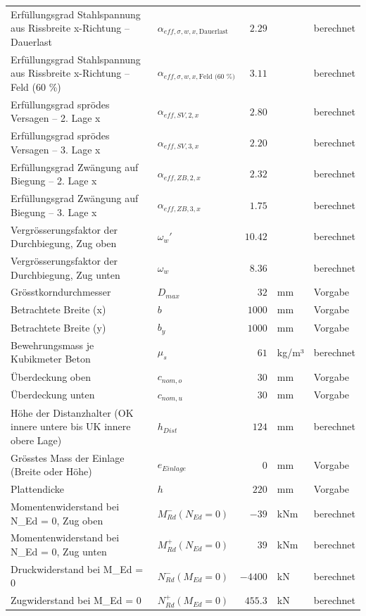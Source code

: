 \documentclass[11pt,a4paper]{article}
\begin{document}
\begin{xltabular}{\linewidth}{>{\raggedright\arraybackslash}Xlrll}
Erfüllungsgrad Stahlspannung aus Rissbreite x-Richtung – Dauerlast & $\alpha_{eff,\sigma,w,x,\text{Dauerlast}}$ & $2.29$ &  & berechnet \\
Erfüllungsgrad Stahlspannung aus Rissbreite x-Richtung – Feld (60 \%) & $\alpha_{eff,\sigma,w,x,\text{Feld (60 \%)}}$ & $3.11$ &  & berechnet \\
Erfüllungsgrad sprödes Versagen – 2. Lage x & $\alpha_{eff,SV,2,x}$ & $2.80$ &  & berechnet \\
Erfüllungsgrad sprödes Versagen – 3. Lage x & $\alpha_{eff,SV,3,x}$ & $2.20$ &  & berechnet \\
Erfüllungsgrad Zwängung auf Biegung – 2. Lage x & $\alpha_{eff,ZB,2,x}$ & $2.32$ &  & berechnet \\
Erfüllungsgrad Zwängung auf Biegung – 3. Lage x & $\alpha_{eff,ZB,3,x}$ & $1.75$ &  & berechnet \\
Vergrösserungsfaktor der Durchbiegung, Zug oben & $\omega_w'$ & $10.42$ &  & berechnet \\
Vergrösserungsfaktor der Durchbiegung, Zug unten & $\omega_w$ & $8.36$ &  & berechnet \\
Grösstkorndurchmesser & $D_{max}$ & $32$ & mm & Vorgabe \\
Betrachtete Breite (x) & $b$ & $1000$ & mm & Vorgabe \\
Betrachtete Breite (y) & $b_y$ & $1000$ & mm & Vorgabe \\
Bewehrungsmass je Kubikmeter Beton & $\mu_s$ & $61$ & kg/m³ & berechnet \\
Überdeckung oben & $c_{nom,o}$ & $30$ & mm & Vorgabe \\
Überdeckung unten & $c_{nom,u}$ & $30$ & mm & Vorgabe \\
Höhe der Distanzhalter (OK innere untere bis UK innere obere Lage) & $h_{Dist}$ & $124$ & mm & berechnet \\
Grösstes Mass der Einlage (Breite oder Höhe) & $e_{Einlage}$ & $0$ & mm & Vorgabe \\
Plattendicke & $h$ & $220$ & mm & Vorgabe \\
Momentenwiderstand bei N\_Ed = 0, Zug oben & $M_{Rd}^{-}(N_{Ed} = 0)$ & $-39$ & kNm & berechnet \\
Momentenwiderstand bei N\_Ed = 0, Zug unten & $M_{Rd}^{+}(N_{Ed} = 0)$ & $39$ & kNm & berechnet \\
Druckwiderstand bei M\_Ed = 0 & $N_{Rd}^{-}(M_{Ed} = 0)$ & $-4400$ & kN & berechnet \\
Zugwiderstand bei M\_Ed = 0 & $N_{Rd}^{+}(M_{Ed} = 0)$ & $455.3$ & kN & berechnet \\

\end{xltabular}
\end{document}
